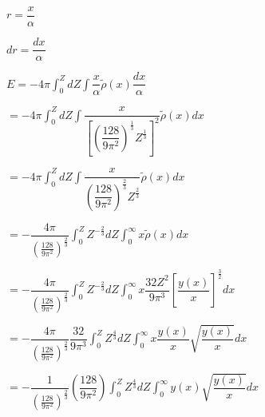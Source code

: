 \documentclass{jarticle}%
\begin{document}
$r=\dfrac{x}{\alpha}$

$dr=\dfrac{dx}{\alpha}$

$E=-4\pi%
{\displaystyle\int\nolimits_{0}^{Z}}
dZ%
{\displaystyle\int}
\dfrac{x}{\alpha}\tilde{\rho}\left(  x\right)  \dfrac{dx}{\alpha}$

$=-4\pi%
{\displaystyle\int\nolimits_{0}^{Z}}
dZ%
{\displaystyle\int}
\dfrac{x}{\left[  \left(  \dfrac{128}{9\pi^{2}}\right)  ^{\frac{1}{3}}%
Z^{\frac{1}{3}}\right]  ^{2}}\tilde{\rho}\left(  x\right)  dx$

$=-4\pi%
{\displaystyle\int\nolimits_{0}^{Z}}
dZ%
{\displaystyle\int}
\dfrac{x}{\left(  \dfrac{128}{9\pi^{2}}\right)  ^{\frac{2}{3}}Z^{\frac{2}{3}}%
}\tilde{\rho}\left(  x\right)  dx$

$=-\dfrac{4\pi}{\left(  \tfrac{128}{9\pi^{2}}\right)  ^{\frac{2}{3}}}%
{\displaystyle\int\nolimits_{0}^{Z}}
Z^{-\frac{2}{3}}dZ%
{\displaystyle\int_{0}^{\infty}}
x\tilde{\rho}\left(  x\right)  dx$

$=-\dfrac{4\pi}{\left(  \tfrac{128}{9\pi^{2}}\right)  ^{\frac{2}{3}}}%
{\displaystyle\int\nolimits_{0}^{Z}}
Z^{-\frac{2}{3}}dZ%
{\displaystyle\int_{0}^{\infty}}
x\dfrac{32Z^{2}}{9\pi^{3}}\left[  \dfrac{y\left(  x\right)  }{x}\right]
^{\frac{3}{2}}dx$

$=-\dfrac{4\pi}{\left(  \tfrac{128}{9\pi^{2}}\right)  ^{\frac{2}{3}}}%
\dfrac{32}{9\pi^{3}}%
{\displaystyle\int\nolimits_{0}^{Z}}
Z^{\frac{4}{3}}dZ%
{\displaystyle\int_{0}^{\infty}}
x\dfrac{y\left(  x\right)  }{x}\sqrt{\dfrac{y\left(  x\right)  }{x}}dx$

$=-\dfrac{1}{\left(  \tfrac{128}{9\pi^{2}}\right)  ^{\frac{2}{3}}}\left(
\dfrac{128}{9\pi^{2}}\right)
{\displaystyle\int\nolimits_{0}^{Z}}
Z^{\frac{4}{3}}dZ%
{\displaystyle\int_{0}^{\infty}}
y\left(  x\right)  \sqrt{\dfrac{y\left(  x\right)  }{x}}dx$
\end{document}
